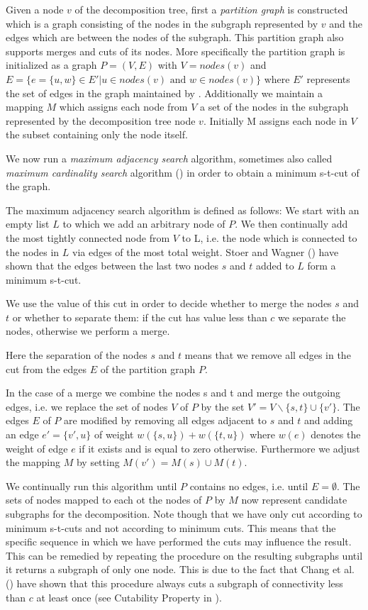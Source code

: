 \documentclass[a4paper,xcolor=dvipsnames, tikz, 12pt]{article}
\newcommand{\crep}{\text{C{\scriptsize REP}}}
\theoremstyle{definition}
\begin{document}
Given a node $v$ of the decomposition tree, first a \textit{partition graph} is constructed which is a graph consisting of the nodes in the subgraph represented by $v$ and the edges which are between the nodes of the subgraph. This partition graph also supports merges and cuts of its nodes. More specifically the partition graph is initialized as a graph $P=(V,E)$ with $V=nodes(v)$ and $E=\{e=\{u,w\}\in E'|u\in nodes(v)\text{ and }w\in nodes(v)\}$ where $E'$ represents the set of edges in the graph maintained by \crep{}. Additionally we maintain a mapping $M$ which assigns each node from $V$ a set of the nodes in the subgraph represented by the decomposition tree node $v$. Initially M assigns each node in $V$ the subset containing only the node itself.

We now run a \textit{maximum adjacency search} algorithm, sometimes also called \textit{maximum cardinality search} algorithm (\cite{Stoer1997}) in order to obtain a minimum s-t-cut of the graph.

The maximum adjacency search algorithm is defined as follows: We start with an empty list $L$ to which we add an arbitrary node of $P$. We then continually add the most tightly connected node from $V$ to L, i.e. the node which is connected to the nodes in $L$ via edges of the most total weight. Stoer and Wagner (\cite{Stoer1997}) have shown that the edges between the last two nodes $s$ and $t$ added to $L$ form a minimum s-t-cut.

We use the value of this cut in order to decide whether to merge the nodes $s$ and $t$ or whether to separate them: if the cut has value less than $c$ we separate the nodes, otherwise we perform a merge.

Here the separation of the nodes $s$ and $t$ means that we remove all edges in the cut from the edges $E$ of the partition graph $P$.

In the case of a merge we combine the nodes s and t and merge the outgoing edges, i.e. we replace the set of nodes $V$ of $P$ by the set $V'=V\backslash\{s,t\}\cup\{v'\}$. The edges $E$ of $P$ are modified by removing all edges adjacent to $s$ and $t$ and adding an edge $e'=\{v',u\}$ of weight $w(\{s,u\})+w(\{t,u\})$ where $w(e)$ denotes the weight of edge $e$ if it exists and is equal to zero otherwise.
Furthermore we adjust the mapping $M$ by setting $M(v')=M(s)\cup M(t)$.

We continually run this algorithm until $P$ contains no edges, i.e. until $E=\emptyset$. The sets of nodes mapped to each ot the nodes of $P$ by $M$ now represent candidate subgraphs for the decomposition. Note though that we have only cut according to minimum s-t-cuts and not according to minimum cuts. This means that the specific sequence in which we have performed the cuts may influence the result. This can be remedied by repeating the procedure on the resulting subgraphs until it returns a subgraph of only one node. This is due to the fact that Chang et al. (\cite{Chang2013}) have shown that this procedure always cuts a subgraph of connectivity less than $c$ at least once (see Cutability Property in \cite{Chang2013}).
\end{document}
